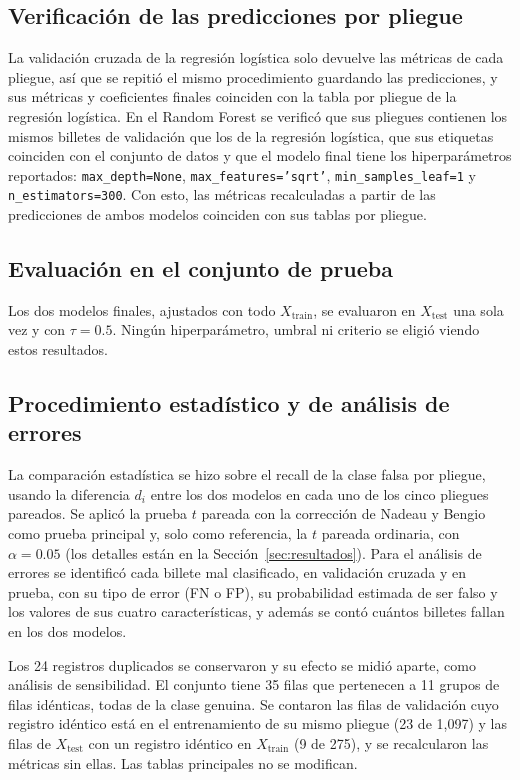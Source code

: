 \documentclass[conference]{IEEEtran}
\begin{document}
	\subsection{Verificación de las predicciones por pliegue}

La validación cruzada de la regresión logística solo devuelve las métricas de cada pliegue, así que se repitió el mismo procedimiento guardando las predicciones, y sus métricas y coeficientes finales coinciden con la tabla por pliegue de la regresión logística. En el Random Forest se verificó que sus pliegues contienen los mismos billetes de validación que los de la regresión logística, que sus etiquetas coinciden con el conjunto de datos y que el modelo final tiene los hiperparámetros reportados: \texttt{max\_depth=None}, \texttt{max\_features='sqrt'}, \texttt{min\_samples\_leaf=1} y \texttt{n\_estimators=300}. Con esto, las métricas recalculadas a partir de las predicciones de ambos modelos coinciden con sus tablas por pliegue.
	
	\subsection{Evaluación en el conjunto de prueba}
	
	Los dos modelos finales, ajustados con todo $X_{\text{train}}$, se evaluaron en $X_{\text{test}}$ una sola vez y con $\tau=0.5$. Ningún hiperparámetro, umbral ni criterio se eligió viendo estos resultados.
	
	\subsection{Procedimiento estadístico y de análisis de errores}
	
	La comparación estadística se hizo sobre el recall de la clase falsa por pliegue, usando la diferencia $d_i$ entre los dos modelos en cada uno de los cinco pliegues pareados. Se aplicó la prueba $t$ pareada con la corrección de Nadeau y Bengio como prueba principal y, solo como referencia, la $t$ pareada ordinaria, con $\alpha=0.05$ (los detalles están en la Sección~\ref{sec:resultados}). Para el análisis de errores se identificó cada billete mal clasificado, en validación cruzada y en prueba, con su tipo de error (FN o FP), su probabilidad estimada de ser falso y los valores de sus cuatro características, y además se contó cuántos billetes fallan en los dos modelos.
	
	Los 24 registros duplicados se conservaron y su efecto se midió aparte, como análisis de sensibilidad. El conjunto tiene 35 filas que pertenecen a 11 grupos de filas idénticas, todas de la clase genuina. Se contaron las filas de validación cuyo registro idéntico está en el entrenamiento de su mismo pliegue (23 de 1,097) y las filas de $X_{\text{test}}$ con un registro idéntico en $X_{\text{train}}$ (9 de 275), y se recalcularon las métricas sin ellas. Las tablas principales no se modifican.
	
\end{document}
